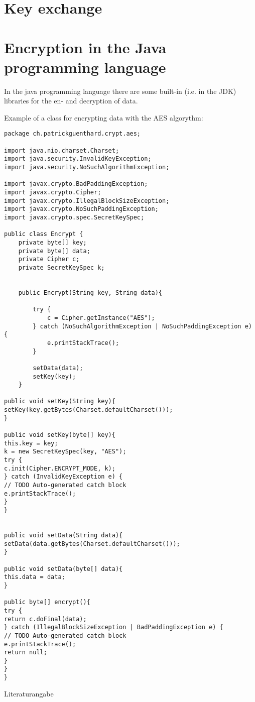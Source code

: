 \documentclass[11pt,twoside,a4paper]{article}
\begin{document}
\section{Key exchange}
\section{Encryption in the Java programming language}
In the java programming language there are some built-in (i.e. in the JDK) libraries for the en- and decryption of data.

Example of a class for encrypting data with the AES algorythm:
\begin{verbatim}
package ch.patrickguenthard.crypt.aes;

import java.nio.charset.Charset;
import java.security.InvalidKeyException;
import java.security.NoSuchAlgorithmException;

import javax.crypto.BadPaddingException;
import javax.crypto.Cipher;
import javax.crypto.IllegalBlockSizeException;
import javax.crypto.NoSuchPaddingException;
import javax.crypto.spec.SecretKeySpec;

public class Encrypt {
	private byte[] key;
	private byte[] data;
	private Cipher c;
	private SecretKeySpec k;


	public Encrypt(String key, String data){

		try {
			c = Cipher.getInstance("AES");
		} catch (NoSuchAlgorithmException | NoSuchPaddingException e) {
			e.printStackTrace();
		}

		setData(data);
		setKey(key);
	}

public void setKey(String key){
setKey(key.getBytes(Charset.defaultCharset()));
}

public void setKey(byte[] key){
this.key = key;
k = new SecretKeySpec(key, "AES");
try {
c.init(Cipher.ENCRYPT_MODE, k);
} catch (InvalidKeyException e) {
// TODO Auto-generated catch block
e.printStackTrace();
}
}


public void setData(String data){
setData(data.getBytes(Charset.defaultCharset()));
}

public void setData(byte[] data){
this.data = data;
}

public byte[] encrypt(){
try {
return c.doFinal(data);
} catch (IllegalBlockSizeException | BadPaddingException e) {
// TODO Auto-generated catch block
e.printStackTrace();
return null;
}
}
}

\end{verbatim}
\begin{thebibliography}{3}
 Literaturangabe
\end{thebibliography}
\end{document}
